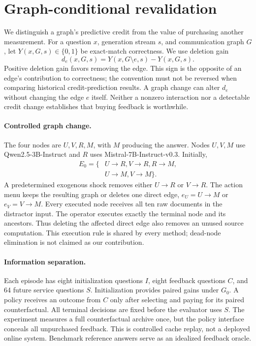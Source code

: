 \section{Graph-conditional revalidation}
\label{sec:method}
We distinguish a graph's predictive credit from the value of purchasing another
measurement. For a question $x$, generation stream $s$, and communication graph
$G$, let $Y(x,G,s)\in\{0,1\}$ be exact-match correctness. We use deletion gain
\begin{equation}
 d_e(x,G,s)=Y(x,G\setminus e,s)-Y(x,G,s).
\end{equation}
Positive deletion gain favors removing the edge. This sign is the opposite of
an edge's contribution to correctness; the convention must not be reversed
when comparing historical credit-prediction results. A graph change can alter
$d_e$ without changing the edge $e$ itself. Neither a nonzero interaction nor a
detectable credit change establishes that buying feedback is worthwhile.

\paragraph{Controlled graph change.}
The four nodes are $U,V,R,M$, with $M$ producing the answer. Nodes $U,V,M$ use
Qwen2.5-3B-Instruct and $R$ uses Mistral-7B-Instruct-v0.3. Initially,
\begin{align}
 E_0=\{&U\!\to\!R,V\!\to\!R,R\!\to\!M,\nonumber\\
       &U\!\to\!M,V\!\to\!M\}.
\end{align}
A predetermined exogenous shock removes either $U\to R$ or $V\to R$.
The action menu keeps the resulting graph or deletes one direct edge,
$e_U=U\to M$ or $e_V=V\to M$. Every executed node receives all ten raw
documents in the distractor input. The operator executes exactly the terminal
node and its ancestors. Thus deleting the affected direct edge also removes an
unused source computation. This execution rule is shared by every method;
dead-node elimination is not claimed as our contribution.

\paragraph{Information separation.}
Each episode has eight initialization questions $I$, eight feedback questions
$C$, and 64 future service questions $S$. Initialization provides paired gains
under $G_0$. A policy receives an outcome from $C$ only after selecting and
paying for its paired counterfactual. All terminal decisions are fixed before
the evaluator uses $S$. The experiment measures a full counterfactual archive
once, but the policy interface conceals all unpurchased feedback. This is
controlled cache replay, not a deployed online system. Benchmark reference
answers serve as an idealized feedback oracle.

